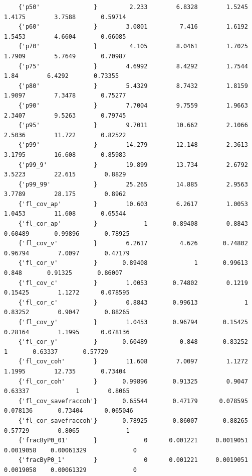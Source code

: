 \documentclass[
]{book}
\begin{document}
\begin{verbatim}
    {'p50'               }         2.233        6.8328        1.5245        1.4175        3.7588       0.59714 
    {'p60'               }        3.0801         7.416        1.6192        1.5453        4.6604       0.66085 
    {'p70'               }         4.105        8.0461        1.7025        1.7909        5.7649       0.70987 
    {'p75'               }        4.6992        8.4292        1.7544          1.84        6.4292       0.73355 
    {'p80'               }        5.4329        8.7432        1.8159        1.9097        7.3478       0.75277 
    {'p90'               }        7.7004        9.7559        1.9663        2.3407        9.5263       0.79745 
    {'p95'               }        9.7011        10.662        2.1066        2.5036        11.722       0.82522 
    {'p99'               }        14.279        12.148        2.3613        3.1795        16.608       0.85983 
    {'p99_9'             }        19.899        13.734        2.6792        3.5223        22.615        0.8829 
    {'p99_99'            }        25.265        14.885        2.9563        3.7789        28.175        0.8962 
    {'fl_cov_ap'         }        10.603        6.2617        1.0053        1.0453        11.608       0.65544 
    {'fl_cor_ap'         }             1       0.89408        0.8843       0.60489       0.99896       0.78925 
    {'fl_cov_v'          }        6.2617         4.626       0.74802       0.96794        7.0097       0.47179 
    {'fl_cor_v'          }       0.89408             1       0.99613         0.848       0.91325       0.86007 
    {'fl_cov_c'          }        1.0053       0.74802        0.1219       0.15425        1.1272      0.078595 
    {'fl_cor_c'          }        0.8843       0.99613             1       0.83252        0.9047       0.88265 
    {'fl_cov_y'          }        1.0453       0.96794       0.15425       0.28164        1.1995      0.078136 
    {'fl_cor_y'          }       0.60489         0.848       0.83252             1       0.63337       0.57729 
    {'fl_cov_coh'        }        11.608        7.0097        1.1272        1.1995        12.735       0.73404 
    {'fl_cor_coh'        }       0.99896       0.91325        0.9047       0.63337             1        0.8065 
    {'fl_cov_savefraccoh'}       0.65544       0.47179      0.078595      0.078136       0.73404      0.065046 
    {'fl_cor_savefraccoh'}       0.78925       0.86007       0.88265       0.57729        0.8065             1 
    {'fracByP0_01'       }             0      0.001221     0.0019051     0.0019058    0.00061329             0 
    {'fracByP0_1'        }             0      0.001221     0.0019051     0.0019058    0.00061329             0 

\end{verbatim}
\end{document}
